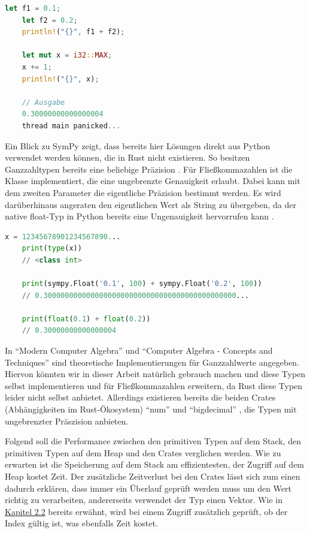 \documentclass[11pt,a4paper, ngerman]{article}
\begin{document}
\begin{lstlisting}[language=rust, caption={Überlauf und Ungenauigkeit}]
    let f1 = 0.1;
    let f2 = 0.2;
    println!("{}", f1 + f2);

    let mut x = i32::MAX;
    x += 1;
    println!("{}", x);

    // Ausgabe
    0.30000000000000004
    thread main panicked...
\end{lstlisting}

Ein Blick zu SymPy zeigt, dass bereits hier Lösungen direkt aus Python verwendet werden können, die in Rust nicht existieren. So besitzen Ganzzahltypen bereits eine beliebige Präzision \cite{PythonDocuIntPrecision}. Für Fließkommazahlen ist die Klasse  implementiert, die eine ungebrenzte Genauigkeit erlaubt. Dabei kann mit dem zweiten Parameter die eigentliche Präzision bestimmt werden. Es wird darüberhinaus angeraten den eigentlichen Wert als String zu übergeben, da der native float-Typ in Python bereits eine Ungenauigkeit hervorrufen kann \cite{SymPyFloat}.

\begin{lstlisting}[language=Python, caption={SymPy Präzision}]
    x = 12345678901234567890...
    print(type(x))
    // <class int>

    print(sympy.Float('0.1', 100) + sympy.Float('0.2', 100))
    // 0.300000000000000000000000000000000000000000000...

    print(float(0.1) + float(0.2))
    // 0.30000000000000004
\end{lstlisting}

In ``Modern Computer Algebra'' \cite[S. 29 ff.]{Gathen2013} und ``Computer Algebra - Concepts and Techniques'' \cite[S. 81 ff.]{Lamagna2019} sind theoretische Implementierungen für Ganzzahlwerte angegeben. Hiervon könnten wir in dieser Arbeit natürlich gebrauch machen und diese Typen selbst implementieren und für Fließkommazahlen erweitern, da Rust diese Typen leider nicht selbst anbietet. Allerdings existieren bereits die beiden Crates (Abhängigkeiten im Rust-Ökosystem) ``num'' \cite{CrateNum} und ``bigdecimal'' \cite{CrateBigdecimal}, die Typen mit ungebrenzter Präszision anbieten.

Folgend soll die Performance zwischen den primitiven Typen auf dem Stack, den primitiven Typen auf dem Heap und den Crates verglichen werden. Wie zu erwarten ist die Speicherung auf dem Stack am effizientesten, der Zugriff auf dem Heap kostet Zeit. Der zusätzliche Zeitverlust bei den Crates lässt sich zum einen dadurch erklären, dass immer ein Überlauf geprüft werden muss um den Wert richtig zu verarbeiten, andererseits verwendet der Typ  einen Vektor. Wie in \hyperref[sec:kap2d2]{Kapitel 2.2} bereits erwähnt, wird bei einem Zugriff zusätzlich geprüft, ob der Index gültig ist, was ebenfalls Zeit kostet.
\end{document}
